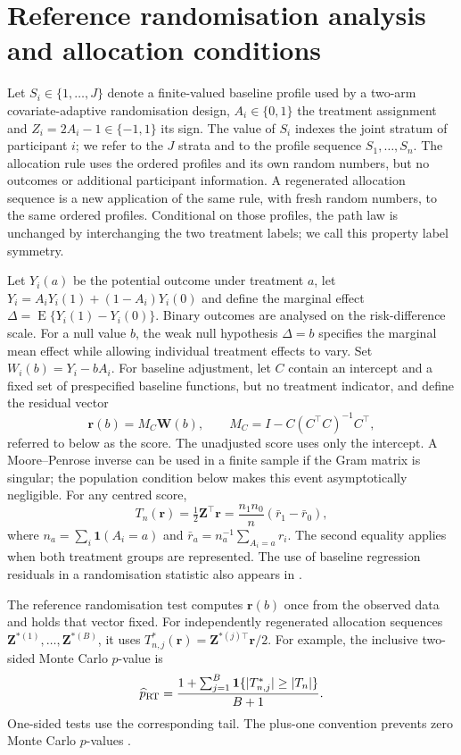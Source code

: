 \documentclass[12pt,a4paper]{article}
\theoremstyle{definition}
\newcommand{\E}{\operatorname E}
\begin{document}
\section{Reference randomisation analysis and allocation conditions}\label{sec:methods}\label{sec:general-allocation}
Let $S_i\in\{1,\ldots,J\}$ denote a finite-valued baseline profile used by a two-arm covariate-adaptive randomisation design, $A_i\in\{0,1\}$ the treatment assignment and $Z_i=2A_i-1\in\{-1,1\}$ its sign. The value of $S_i$ indexes the joint stratum of participant $i$; we refer to the $J$ strata and to the profile sequence $S_1,\ldots,S_n$. The allocation rule uses the ordered profiles and its own random numbers, but no outcomes or additional participant information. A regenerated allocation sequence is a new application of the same rule, with fresh random numbers, to the same ordered profiles. Conditional on those profiles, the path law is unchanged by interchanging the two treatment labels; we call this property label symmetry.

Let $Y_i(a)$ be the potential outcome under treatment $a$, let $Y_i=A_iY_i(1)+(1-A_i)Y_i(0)$ and define the marginal effect $\Delta=\E\{Y_i(1)-Y_i(0)\}$. Binary outcomes are analysed on the risk-difference scale. For a null value $b$, the weak null hypothesis $\Delta=b$ specifies the marginal mean effect while allowing individual treatment effects to vary. Set $W_i(b)=Y_i-bA_i$. For baseline adjustment, let $C$ contain an intercept and a fixed set of prespecified baseline functions, but no treatment indicator, and define the residual vector
\[
 \bm r(b)=M_C\bm W(b),\qquad
 M_C=I-C(C^\top C)^{-1}C^\top ,
\]
referred to below as the score. The unadjusted score uses only the intercept. A Moore--Penrose inverse can be used in a finite sample if the Gram matrix is singular; the population condition below makes this event asymptotically negligible. For any centred score,
\begin{equation}\label{eq:T-score}
 T_n(\bm r)=\tfrac12\bm Z^\top\bm r
          =\frac{n_1n_0}{n}(\bar r_1-\bar r_0),
\end{equation}
where $n_a=\sum_i\mathbf1(A_i=a)$ and $\bar r_a=n_a^{-1}\sum_{A_i=a}r_i$. The second equality applies when both treatment groups are represented. The use of baseline regression residuals in a randomisation statistic also appears in \citet[equations~(10.7)--(10.8)]{Smith1984}.

The reference randomisation test computes $\bm r(b)$ once from the observed data and holds that vector fixed. For independently regenerated allocation sequences $\bm Z^{*(1)},\ldots,\bm Z^{*(B)}$, it uses $T_{n,j}^*(\bm r)=\bm Z^{*(j)\top}\bm r/2$. For example, the inclusive two-sided Monte Carlo $p$-value is
\begin{equation}\label{eq:rt-p}
 \widehat p_{\rm RT}=\frac{1+\sum_{j=1}^B
 \mathbf1\{|T_{n,j}^*|\ge|T_n|\}}{B+1}.
\end{equation}
One-sided tests use the corresponding tail. The plus-one convention prevents zero Monte Carlo $p$-values \citep{PhipsonSmyth2010}.
\end{document}

